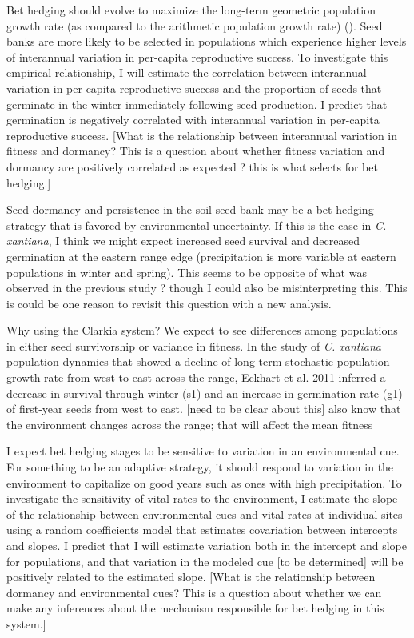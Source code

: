 \documentclass[12pt, oneside, titlepage]{article}   	%
\begin{document}
{Bet hedging should evolve to maximize the long-term geometric population growth rate (as compared to the arithmetic population growth rate) (\cite{cohen1966,cohen1968,ellner1985,ellner1985a}). Seed banks are more likely to be selected in populations which experience higher levels of interannual variation in per-capita reproductive success. To investigate this empirical relationship, I will estimate the correlation between interannual variation in per-capita reproductive success and the proportion of seeds that germinate in the winter immediately following seed production. I predict that germination is negatively correlated with interannual variation in per-capita reproductive success. [What is the relationship between interannual variation in fitness and dormancy? This is a question about whether fitness variation and dormancy are positively correlated as expected ? this is what selects for bet hedging.]

Seed dormancy and persistence in the soil seed bank may be a bet-hedging strategy that is favored by environmental uncertainty. If this is the case in \textit{C. xantiana}, I think we might expect increased seed survival and decreased germination at the eastern range edge (precipitation is more variable at eastern populations in winter and spring). This seems to be opposite of what was observed in the previous study ? though I could also be misinterpreting this. This is could be one reason to revisit this question with a new analysis. 

Why using the Clarkia system? We expect to see differences among populations in either seed survivorship or variance in fitness. In the study of \textit{C. xantiana} population dynamics that showed a decline of long-term stochastic population growth rate from west to east across the range, Eckhart et al. 2011 inferred a decrease in survival through winter (s1) and an increase in germination rate (g1) of first-year seeds from west to east. [need to be clear about this] also know that the environment changes across the range; that will affect the mean fitness

I expect bet hedging stages to be sensitive to variation in an environmental cue. For something to be an adaptive strategy, it should respond to variation in the environment to capitalize on good years such as ones with high precipitation. To investigate the sensitivity of vital rates to the environment, I estimate the slope of the relationship between environmental cues and vital rates at individual sites using a random coefficients model that estimates covariation between intercepts and slopes. I predict that I will estimate variation both in the intercept and slope for populations, and that variation in the modeled cue [to be determined] will be positively related to the estimated slope. [What is the relationship between dormancy and environmental cues? This is a question about whether we can make any inferences about the mechanism responsible for bet hedging in this system.]
\fi


}
\end{document}

